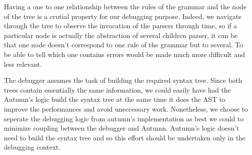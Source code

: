 	\bigskip

	Having a one to one relationship between the rules of the grammar and the node of the tree is a crutial property for our debugging purpose. Indeed, we navigate through the tree to observe the invocation of the parsers through time, so if a particular node is actually the abstraction of several children parser, it can be that one node doesn't correspond to one rule of the grammar but to several. To be able to tell which one contains errors would be made much more difficult and less relevant.

	\bigskip

	The debugger assumes the task of building the required syntax tree. Since both trees contain essentially the same information, we could easily have had the Autumn's logic build the syntax tree at the same time it does the AST to improve the performances and avoid uneccessary work. Nonetheless, we choose to seperate the debugging logic from autumn's implementation as best we could to minimize coupling between the debugger and Autumn. Autumn's logic doesn't need to build the syntax tree and so this effort should be undertaken only in the debugging context.

